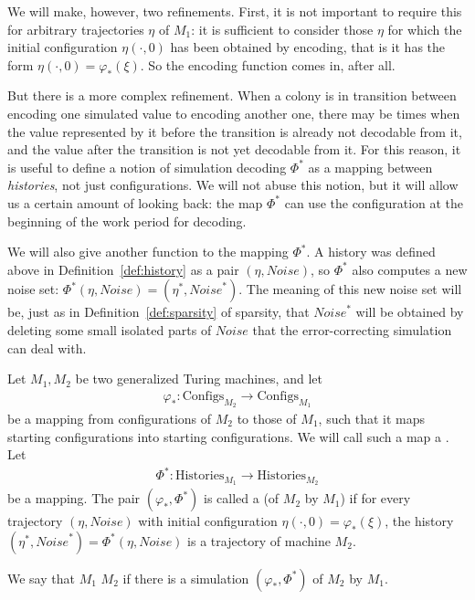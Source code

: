\documentclass[12pt]{memoir}
\newcommand{\Configs}{\mathrm{Configs}}
\newcommand{\Noise}{\mathit{Noise}}
\newcommand{\Histories}{\mathrm{Histories}}
\begin{document}
We will make, however, two refinements.
First, it is not important to require this for arbitrary trajectories \( \eta \) of \( M_{1} \):
it is sufficient to consider those \( \eta \) for which the initial configuration
 \( \eta(\cdot,0) \) has been obtained by encoding, that is it has the form 
\( \eta(\cdot,0)=\varphi_{*}(\xi) \).
So the encoding function comes in, after all.

But there is a more complex refinement.
When a colony is in transition between encoding one simulated value to encoding another one,
there may be times when the value represented by it before the transition
is already not decodable from it, and the value after the transition is not yet decodable from it.
For this reason, it is useful to define a notion of simulation decoding \( \Phi^{*} \)
as a mapping between \emph{histories}, not just configurations.
We will not abuse this notion, but it will allow us a certain amount of looking back:
the map \( \Phi^{*} \) can use the configuration at the beginning of the work period for decoding.

We will also give another function to the mapping \( \Phi^{*} \).
A history was defined above in Definition~\ref{def:history} 
as a pair \( (\eta,\Noise) \),
so \( \Phi^{*} \) also computes a new noise set:
\( \Phi^{*}(\eta,\Noise)=(\eta^{*},\Noise^{*}) \).
The meaning of this new noise set will be, just as in Definition~\ref{def:sparsity} of sparsity,
that 
\( \Noise^{*} \) will be obtained by deleting some small isolated parts of \( \Noise \) that the 
error-correcting simulation can deal with.

\begin{definition}[Simulation] \label{def:simulation-central}
Let \( M_{1},M_{2} \) be two generalized Turing machines, and let
\begin{align*}
    \varphi_{*}:\Configs_{M_{2}} \to \Configs_{M_{1}}
\end{align*}
be a mapping from configurations of \( M_{2} \)
to those of \( M_{1} \), such that it maps
starting configurations into starting configurations.
We will call such a map a .
Let
\begin{align*}
   \Phi^{*}:\Histories_{M_{1}} \to \Histories_{M_{2}}
\end{align*}
be a mapping.
The pair \( (\varphi_{*}, \Phi^{*})  \)
is called a  (of \(  M_{2}  \) by \(  M_{1}  \)) if for every
trajectory \(  (\eta, \Noise)  \) with initial
configuration \(  \eta(\cdot,0)=\varphi_{*}(\xi)  \),
the history \(  (\eta^{*},\Noise^{*})=\Phi^{*}(\eta,\Noise)  \) is
a trajectory of machine \(  M_{2}  \).

We say that \( M_{1} \)  \( M_{2} \) if there is a simulation
\( (\varphi_{*},\Phi^{*}) \) of \( M_{2} \) by \( M_{1} \).
\end{definition}
\end{document}
